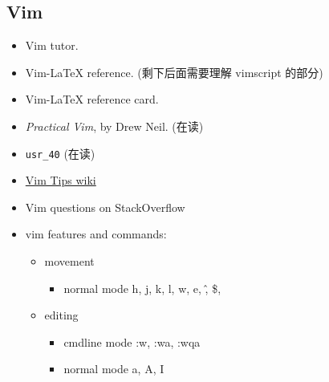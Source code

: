 \documentclass{article}
\newcommand{\book}[1]{\textit{#1}}
\begin{document}
\subsection{Vim}
\begin{itemize}
    \item Vim tutor.
    \item Vim-LaTeX reference. (剩下后面需要理解 vimscript 的部分)
    \item Vim-LaTeX reference card.
    \item \book{Practical Vim}, by Drew Neil. (在读)
    \item \verb|usr_40| (在读)
    \item \href{http://vim.wikia.com/wiki/Vim_Tips_Wiki}{Vim Tips wiki}
    \item Vim questions on StackOverflow
    \item vim features and commands:
        \begin{itemize}
            \item movement
                \begin{itemize}
                    \item normal mode
                        h, j, k, l, w, e, \^, \$,
                \end{itemize}
            \item editing
                \begin{itemize}
                    \item cmdline mode
                        :w, :wa, :wqa
                    \item normal mode
                        a, A, I
                \end{itemize}
        \end{itemize}
\end{itemize}
\end{document}
